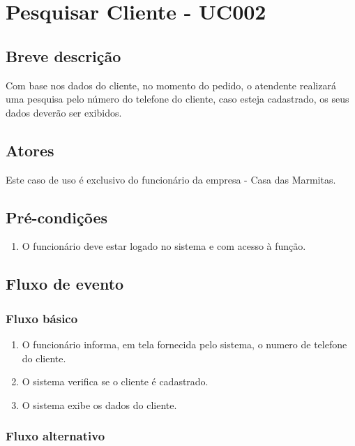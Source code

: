 \chapter{Pesquisar Cliente - UC002} \label{uc002}

\section{Breve descrição}

Com base nos dados do cliente, no momento do pedido, o atendente realizará uma pesquisa pelo número do telefone do cliente, caso esteja cadastrado, os seus dados deverão ser exibidos.

\section{Atores}

Este caso de uso é exclusivo do funcionário da empresa - Casa das Marmitas.

\section{Pré-condições}

\begin{enumerate}
	\item O funcionário deve estar logado no sistema e com acesso à função.
\end{enumerate}

\section{Fluxo de evento}

\subsection{Fluxo básico}

\begin{enumerate}
	\item O funcionário informa, em tela fornecida pelo sistema, o numero de telefone do cliente.	
	\item O sistema verifica se o cliente é cadastrado.
	\item O sistema exibe os dados do cliente.
\end{enumerate}

\subsection{Fluxo alternativo}

